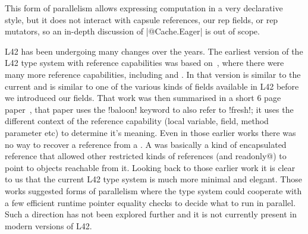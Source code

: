 This form of parallelism allows expressing computation in a very declarative style, but it does not interact with capsule references, our rep fields, or rep mutators, so an in-depth discussion of \Q|@Cache.Eager| is out of scope.

L42 has been undergoing many changes over the years.
The earliest version of the L42 type system with reference capabilities was based on~\cite{servettoballoon},
where there were many more reference capabilities, including
\Q@fresh@ and \Q@baloon@.
In that version \Q@fresh@ is similar to the current \Q@capsule@ and \Q@baloon@ is similar to one of the various kinds of \Q@capsule@ fields available in L42 before we introduced our \Q@rep@ fields.
That work was then summarised in a short 6 page paper~\cite{ServettoEtAl13a}, that
paper uses the \Q!baloon! keyword to also refer to \Q!fresh!; it uses the different context of the reference capability (local variable, field, method parameter etc) to determine it's meaning.
Even in those earlier works there was no way to recover a \Q@fresh@ reference from a \Q@baloon@. A \Q@baloon@ was basically a kind of encapsulated reference that allowed other restricted kinds of references (\Q@external@ and \Q@external readonly@) to point to objects reachable from it. Looking back to those earlier work it is clear to us that the current L42 type system is much more minimal and elegant.
Those works suggested forms of parallelism where the type system could cooperate with a few efficient runtime pointer equality checks to decide what to run in parallel.
Such a direction has not been explored further and it is not currently present in modern versions of L42.
